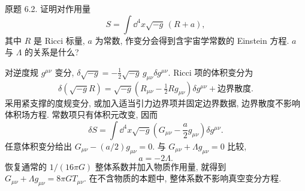 \begin{exercise}
原题 6.2. 证明对作用量
\[
S=\int\dd^4x\sqrt{-g}\,(R+a),
\]
其中 $R$ 是 Ricci 标量, $a$ 为常数, 作变分会得到含宇宙学常数的 Einstein 方程. $a$ 与 $\Lambda$ 的关系是什么?
\end{exercise}
\begin{solution}
对逆度规 $g^{\mu\nu}$ 变分, $\delta\sqrt{-g}=-\tfrac12\sqrt{-g}\,g_{\mu\nu}\delta g^{\mu\nu}$. Ricci 项的体积变分为
\[
\delta(\sqrt{-g}R)
=\sqrt{-g}\left(R_{\mu\nu}-\tfrac12Rg_{\mu\nu}\right)\delta g^{\mu\nu}
+\text{边界散度}.
\]
采用紧支撑的度规变分, 或加入适当引力边界项并固定边界数据, 边界散度不影响体积场方程. 常数项只有体积元改变, 因而
\[
\delta S=\int\dd^4x\sqrt{-g}\left(G_{\mu\nu}-\frac a2g_{\mu\nu}\right)\delta g^{\mu\nu}.
\]
任意体积变分给出 $G_{\mu\nu}-(a/2)g_{\mu\nu}=0$. 与 $G_{\mu\nu}+\Lambda g_{\mu\nu}=0$ 比较,
\[
a=-2\Lambda.
\]
恢复通常的 $1/(16\pi G)$ 整体系数并加入物质作用量, 就得到 $G_{\mu\nu}+\Lambda g_{\mu\nu}=8\pi GT_{\mu\nu}$. 在不含物质的本题中, 整体系数不影响真空变分方程.
\end{solution}

